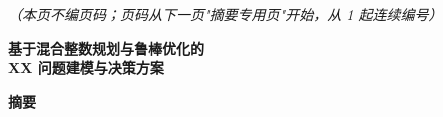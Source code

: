 \documentclass[12pt,a4paper]{ctexart}
\begin{document}
\vspace{40pt}
\begin{center}
  \itshape （本页不编页码；页码从下一页"摘要专用页"开始，从 1 起连续编号）
\end{center}

\newpage



\begingroup
\linespread{1.3}\selectfont           %

\begin{center}
  {\bfseries
   基于混合整数规划与鲁棒优化的\\[4pt]
   XX 问题建模与决策方案}             %
\end{center}

\vspace{8pt}

\begin{center}
  {\bfseries 摘\quad 要}
\end{center}
\end{document}
